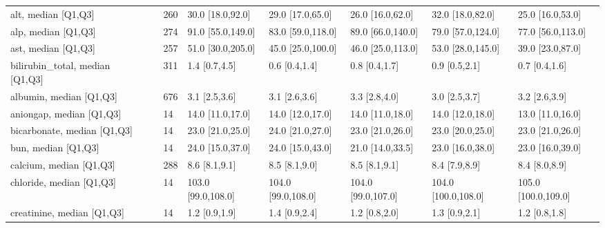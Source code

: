 \begin{tabular}{llllllll}
alt, median [Q1,Q3] &                                   &             260 &          30.0 [18.0,92.0] &          29.0 [17.0,65.0] &         26.0 [16.0,62.0] &          32.0 [18.0,82.0] &         25.0 [16.0,53.0] \\
alp, median [Q1,Q3] &                                   &             274 &         91.0 [55.0,149.0] &         83.0 [59.0,118.0] &        89.0 [66.0,140.0] &         79.0 [57.0,124.0] &        77.0 [56.0,113.0] \\
ast, median [Q1,Q3] &                                   &             257 &         51.0 [30.0,205.0] &         45.0 [25.0,100.0] &        46.0 [25.0,113.0] &         53.0 [28.0,145.0] &         39.0 [23.0,87.0] \\
bilirubin\_total, median [Q1,Q3] &                                   &             311 &             1.4 [0.7,4.5] &             0.6 [0.4,1.4] &            0.8 [0.4,1.7] &             0.9 [0.5,2.1] &            0.7 [0.4,1.6] \\
albumin, median [Q1,Q3] &                                   &             676 &             3.1 [2.5,3.6] &             3.1 [2.6,3.6] &            3.3 [2.8,4.0] &             3.0 [2.5,3.7] &            3.2 [2.6,3.9] \\
aniongap, median [Q1,Q3] &                                   &              14 &          14.0 [11.0,17.0] &          14.0 [12.0,17.0] &         14.0 [11.0,18.0] &          14.0 [12.0,18.0] &         13.0 [11.0,16.0] \\
bicarbonate, median [Q1,Q3] &                                   &              14 &          23.0 [21.0,25.0] &          24.0 [21.0,27.0] &         23.0 [21.0,26.0] &          23.0 [20.0,25.0] &         23.0 [21.0,26.0] \\
bun, median [Q1,Q3] &                                   &              14 &          24.0 [15.0,37.0] &          24.0 [15.0,43.0] &         21.0 [14.0,33.5] &          23.0 [16.0,38.0] &         23.0 [16.0,39.0] \\
calcium, median [Q1,Q3] &                                   &             288 &             8.6 [8.1,9.1] &             8.5 [8.1,9.0] &            8.5 [8.1,9.1] &             8.4 [7.9,8.9] &            8.4 [8.0,8.9] \\
chloride, median [Q1,Q3] &                                   &              14 &        103.0 [99.0,108.0] &        104.0 [99.0,108.0] &       104.0 [99.0,107.0] &       104.0 [100.0,108.0] &      105.0 [100.0,109.0] \\
creatinine, median [Q1,Q3] &                                   &              14 &             1.2 [0.9,1.9] &             1.4 [0.9,2.4] &            1.2 [0.8,2.0] &             1.3 [0.9,2.1] &            1.2 [0.8,1.8] \\

\end{tabular}
